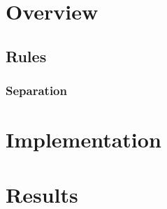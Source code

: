 \documentclass[12pt]{article}
\begin{document}
\section{Overview}
\subsection{Rules}
\subsubsection{Separation}

\section{Implementation}

\section{Results}
\end{document}
